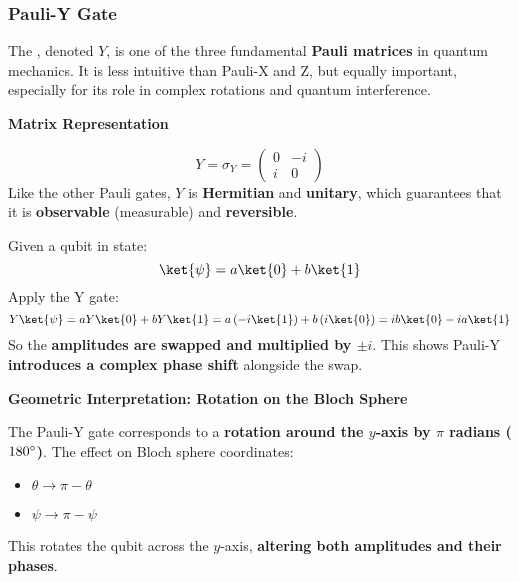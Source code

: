 \subsubsection{Pauli-Y Gate}\label{subsubsection: Pauli-Y Gate}

The , denoted $Y$, is one of the three fundamental \textbf{Pauli matrices} in quantum mechanics. It is less intuitive than Pauli-X and Z, but equally important, especially for its role in complex rotations and quantum interference.

\highspace
\begin{flushleft}
    \textcolor{Green3}{ \textbf{Matrix Representation}}
\end{flushleft}
\begin{equation*}
    Y = \sigma_{Y} = \begin{pmatrix}
        0 & -i \\ i & 0
    \end{pmatrix}
\end{equation*}
Like the other Pauli gates, $Y$ is \textbf{Hermitian} and \textbf{unitary}, which guarantees that it is \textbf{observable} (measurable) and \textbf{reversible}.

\highspace
\begin{flushleft}
    \textcolor{Green3}{}
\end{flushleft}
Given a qubit in state:
\begin{equation*}
	\ket{\psi} = a\ket{0} + b\ket{1}
\end{equation*}
Apply the Y gate:
\begin{equation*}
	Y\ket{\psi} = aY\ket{0} + bY\ket{1} = a\left(-i \ket{1}\right) + b\left(i \ket{0}\right) = ib\ket{0} - ia\ket{1}
\end{equation*}
So the \textbf{amplitudes are swapped and multiplied by $\pm i$}. This shows Pauli-Y \textbf{introduces a complex phase shift} alongside the swap.

\highspace
\begin{flushleft}
    \textcolor{Green3}{ \textbf{Geometric Interpretation: Rotation on the Bloch Sphere}}
\end{flushleft}
The Pauli-Y gate corresponds to a \textbf{rotation around the $y$-axis by $\pi$ radians ($180 \degree$)}. The effect on Bloch sphere coordinates:
\begin{itemize}
    \item $\theta \rightarrow \pi - \theta$
    \item $\psi \rightarrow \pi - \psi$
\end{itemize}
This rotates the qubit across the $y$-axis, \textbf{altering both amplitudes and their phases}.

